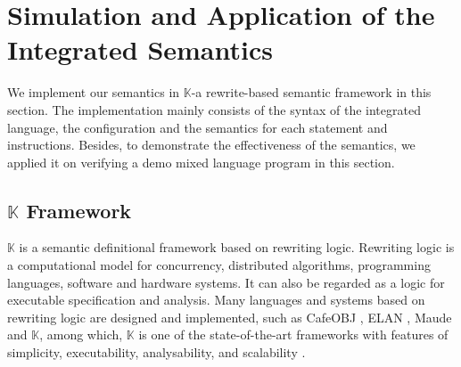 \documentclass[letterpaper, 10 pt, conference]{IEEEtran}
\begin{document}
\section{Simulation and Application of the Integrated Semantics}
\par We implement our semantics in $\mathbb{K}$-a rewrite-based semantic framework in this section. The implementation mainly consists of the syntax of the integrated language, the configuration and the semantics for each statement and instructions. Besides, to demonstrate the effectiveness of the semantics, we applied it on verifying a demo mixed language program in this section.

\subsection{$\mathbb{K}$ Framework}
$\mathbb{K}$ is a semantic definitional framework based on rewriting logic. Rewriting logic \cite{rewriting} is a computational model for concurrency, distributed algorithms, programming languages, software and hardware systems. It can also be regarded as a logic for executable specification and analysis.  Many languages and systems based on rewriting logic are designed and implemented, such as CafeOBJ \cite{CafeOBJ}, ELAN \cite{ELAN}, Maude \cite{maude} and $\mathbb{K}$, among which,  $\mathbb{K}$  is one of the state-of-the-art frameworks with features of simplicity, executability, analysability, and scalability \cite{kprimer}.
\end{document}
